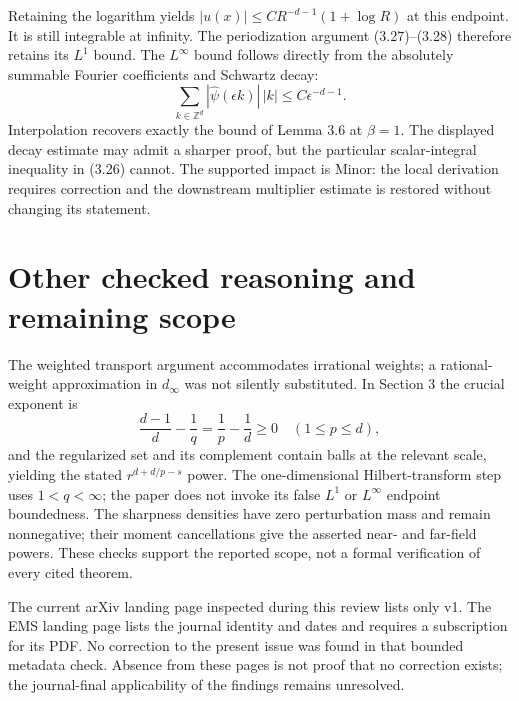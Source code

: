 \documentclass[10pt]{article}
\begin{document}
Retaining the logarithm yields \(|u(x)|\le C R^{-d-1}(1+\log R)\) at this endpoint. It is still integrable at infinity. The periodization argument (3.27)–(3.28) therefore retains its \(L^1\) bound. The \(L^\infty\) bound follows directly from the absolutely summable Fourier coefficients and Schwartz decay: \[\sum_{k\in\mathbb Z^d}|\widehat\psi(\epsilon k)|\,|k|
 \le C\epsilon^{-d-1}.\] Interpolation recovers exactly the bound of Lemma 3.6 at \(\beta=1\). The displayed decay estimate may admit a sharper proof, but the particular scalar-integral inequality in (3.26) cannot. The supported impact is Minor: the local derivation requires correction and the downstream multiplier estimate is restored without changing its statement.\par
\section*{Other checked reasoning and remaining scope}
The weighted transport argument accommodates irrational weights; a rational-weight approximation in \(d_\infty\) was not silently substituted. In Section 3 the crucial exponent is \[\frac{d-1}{d}-\frac1q=\frac1p-\frac1d\ge0
 \quad(1\le p\le d),\] and the regularized set and its complement contain balls at the relevant scale, yielding the stated \(r^{d+d/p-s}\) power. The one-dimensional Hilbert-transform step uses \(1<q<\infty\); the paper does not invoke its false \(L^1\) or \(L^\infty\) endpoint boundedness. The sharpness densities have zero perturbation mass and remain nonnegative; their moment cancellations give the asserted near- and far-field powers. These checks support the reported scope, not a formal verification of every cited theorem.\par
The current arXiv landing page inspected during this review lists only v1. The EMS landing page lists the journal identity and dates and requires a subscription for its PDF. No correction to the present issue was found in that bounded metadata check. Absence from these pages is not proof that no correction exists; the journal-final applicability of the findings remains unresolved.\par
\end{document}
